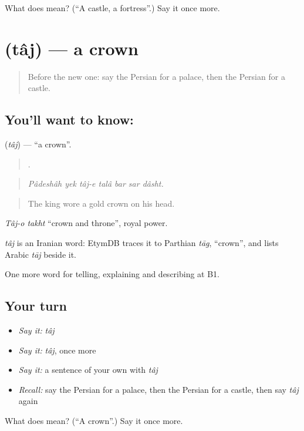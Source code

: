 \begin{tcolorbox}[breakable,colback=teal!4,colframe=teal!35!black,title={Before you move on}]
What does  mean? (\textquotedblleft{}A castle, a fortress\textquotedblright{}.) Say it once more.
\end{tcolorbox}
\section[\texorpdfstring{\fa{تاج} (tâj)}{تاج (tâj)}]{ (tâj) — a crown}

\label{lesson:FA-C350-taj}



\begin{quote}
Before the new one: say the Persian for a palace, then the Persian for a castle.
\end{quote}

\subsection*{You'll want to know: }
\textbf{} (\emph{tâj}) — \textquotedblleft{}a crown\textquotedblright{}.

\begin{quote}
      .
\end{quote}

\begin{quote}
\emph{Pâdeshâh yek tâj-e talâ bar sar dâsht.}
\end{quote}

\begin{quote}
The king wore a gold crown on his head.
\end{quote}

\emph{Tâj-o takht} \textquotedblleft{}crown and throne\textquotedblright{}, royal power.

\begin{cousinweb}
\emph{tâj} is an Iranian word: EtymDB traces it to Parthian \emph{tāg}, \textquotedblleft{}crown\textquotedblright{}, and lists Arabic \emph{tāj} beside it.
\end{cousinweb}

\begin{grammarlens}[title={What you've built}]
One more word for telling, explaining and describing at B1.
\end{grammarlens}

\subsection*{Your turn}
\begin{itemize}
\raggedright
  \item \emph{Say it:} \emph{tâj}
  \item \emph{Say it:} \emph{tâj}, once more
  \item \emph{Say it:} a sentence of your own with \emph{tâj}
  \item \emph{Recall:} say the Persian for a palace, then the Persian for a castle, then say \emph{tâj} again
\end{itemize}

\begin{tcolorbox}[breakable,colback=teal!4,colframe=teal!35!black,title={Before you move on}]
What does  mean? (\textquotedblleft{}A crown\textquotedblright{}.) Say it once more.
\end{tcolorbox}
